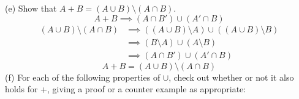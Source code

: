 \documentclass{article}
\begin{document}
(e) Show that $A+B = (A \cup B)\setminus(A \cap B)$.
\begin{equation*}
    A+B \implies ( A \cap B') \cup (A' \cap B)
\end{equation*}
\begin{align*}
    (A \cup B)\setminus(A \cap B) &\implies ((A \cup B)\setminus A) \cup ((A \cup B)\setminus B)\\
    &\implies (B\setminus A) \cup (A \setminus B)\\
    &\implies (A\cap B') \cup (A' \cap B)
\end{align*}
\begin{equation*}
    A+B = (A \cup B)\setminus(A \cap B)
\end{equation*}
\newpage
(f) For each of the following properties of $\cup$, check out whether or not it also holds for +, giving a proof or a counter example as appropriate:
\renewcommand{\labelenumi}{\roman{enumi}}
\end{document}
